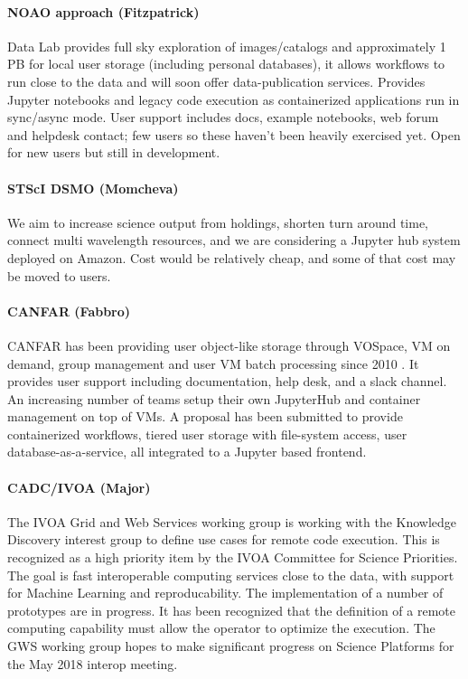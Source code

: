 \documentclass[11pt,twoside]{article}
\begin{document}
\paragraph*{NOAO approach (Fitzpatrick)} Data Lab \citep{2016SPIE.9913E..0LF} provides full sky exploration of images/catalogs and approximately 1 PB for local user storage (including personal databases), it allows workflows to run close to the data and will soon offer data-publication services. Provides Jupyter notebooks and legacy code execution as containerized applications run in sync/async mode. User support includes docs, example notebooks, web forum and helpdesk contact; few users so these haven't been heavily exercised yet.  Open for new users but still in development.

\paragraph*{STScI DSMO (Momcheva)} We aim to increase science output from holdings, shorten turn around time, connect multi wavelength resources, and we are considering a Jupyter hub system deployed on Amazon. Cost would be relatively cheap, and some of that cost may be moved to users.

\paragraph*{CANFAR (Fabbro)} CANFAR has been providing user object-like storage through VOSpace, VM on demand, group management and user VM batch processing since 2010 \citep{2010SPIE.7740E..1IG}. It provides user support including documentation, help desk, and a slack channel. An increasing number of teams setup their own JupyterHub and container management on top of VMs. A proposal has been submitted to provide containerized workflows, tiered user storage with file-system access, user database-as-a-service, all integrated to a Jupyter based frontend.

\paragraph*{CADC/IVOA (Major)} The IVOA Grid and Web Services working group is working with the Knowledge Discovery interest group to define use cases for remote code execution.  This is recognized as a high priority item by the IVOA Committee for Science Priorities.  The goal is fast interoperable computing services close to the data, with support for Machine Learning and reproducability.  The implementation of a number of prototypes are in progress.  It has been recognized that the definition of a remote computing capability must allow the operator to optimize the execution.  The GWS working group hopes to make significant progress on Science Platforms for the May 2018 interop meeting.  
\end{document}
